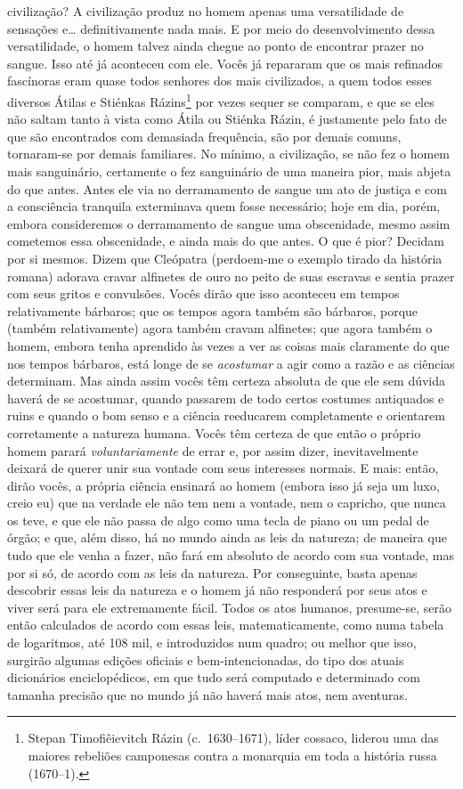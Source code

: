 civilização? A civilização produz no homem apenas uma versatilidade de
sensações e\ldots{} definitivamente nada mais. E por meio do desenvolvimento
dessa versatilidade, o homem talvez ainda chegue ao ponto de encontrar prazer
no sangue. Isso até já aconteceu com ele. Vocês já repararam que os mais
refinados fascínoras eram quase todos senhores dos mais civilizados, a quem
todos esses diversos Átilas e Stiénkas Rázins\footnote{ Stepan Timofiêievitch
Rázin (c.~1630--1671), líder cossaco, liderou uma das maiores rebeliões
camponesas contra a monarquia em toda a história russa (1670--1).} por vezes
sequer se comparam, e que se eles não saltam tanto à vista como Átila ou
Stiénka Rázin, é justamente pelo fato de que são encontrados com demasiada
frequência, são por demais comuns, tornaram-se por demais familiares.  No
mínimo, a civilização, se não fez o homem mais sanguinário, certamente o fez
sanguinário de uma maneira pior, mais abjeta do que antes. Antes ele via no
derramamento de sangue um ato de justiça e com a consciência tranquila
exterminava quem fosse necessário; hoje em dia, porém, embora consideremos o
derramamento de sangue uma obscenidade, mesmo assim cometemos essa obscenidade,
e ainda mais do que antes. O que é pior? Decidam por si mesmos. Dizem que
Cleópatra (perdoem-me o exemplo tirado da história romana) adorava cravar
alfinetes de ouro no peito de suas escravas e sentia prazer com seus gritos e
convulsões.  Vocês dirão que isso aconteceu em tempos relativamente bárbaros;
que os tempos agora também são bárbaros, porque (também relativamente) agora
também cravam alfinetes; que agora também o homem, embora tenha aprendido às
vezes a ver as coisas mais claramente do que nos tempos bárbaros, está
longe de se \textit{acostumar} a agir como a razão e as ciências determinam.
Mas ainda assim vocês têm certeza absoluta de que ele sem dúvida haverá de se
acostumar, quando passarem de todo certos costumes antiquados e ruins e quando
o bom senso e a ciência reeducarem completamente e orientarem corretamente a
natureza humana.  Vocês têm certeza de que então o próprio homem parará
\textit{voluntariamente} de errar e, por assim dizer, inevitavelmente deixará
de querer unir sua vontade com seus interesses normais. E mais: então, dirão
vocês, a própria ciência ensinará ao homem (embora isso já seja um luxo, creio
eu) que na verdade ele não tem nem a vontade, nem o capricho, que nunca os
teve, e que ele não passa de algo como uma tecla de piano ou um pedal de órgão;
e que, além disso, há no mundo ainda as leis da natureza; de maneira que tudo
que ele venha a fazer, não fará em absoluto de acordo com sua vontade, mas por
si só, de acordo com as leis da natureza. Por conseguinte, basta apenas
descobrir essas leis da natureza e o homem já não responderá por seus atos e
viver será para ele extremamente fácil. Todos os atos humanos, presume-se,
serão então calculados de acordo com essas leis, matematicamente, como numa
tabela de logaritmos, até 108 mil, e introduzidos num quadro; ou melhor que
isso, surgirão algumas edições oficiais e bem-intencionadas, do tipo dos atuais
dicionários enciclopédicos, em que tudo será computado e determinado com
tamanha precisão que no mundo já não haverá mais atos, nem aventuras.

